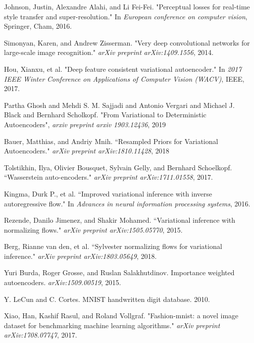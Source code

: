 \documentclass{article}
\begin{document}
\begin{thebibliography}{9}
    Johnson, Justin, Alexandre Alahi, and Li Fei-Fei. "Perceptual losses for real-time style transfer and super-resolution." In \textit{European conference on computer vision}, Springer, Cham, 2016.
    
    Simonyan, Karen, and Andrew Zisserman. "Very deep convolutional networks for large-scale image recognition." \textit{arXiv preprint arXiv:1409.1556}, 2014.
    
    Hou, Xianxu, et al. "Deep feature consistent variational autoencoder." In \textit{2017 IEEE Winter Conference on Applications of Computer Vision (WACV)}, IEEE, 2017.

  Partha Ghosh and Mehdi S. M. Sajjadi and Antonio Vergari and Michael J. Black and Bernhard Scholkopf. "From Variational to Deterministic Autoencoders", \textit{arxiv preprint arxiv 1903.12436}, 2019
  
    Bauer, Matthias, and Andriy Mnih. ``Resampled Priors for Variational Autoencoders." \textit{arXiv preprint arXiv:1810.11428}, 2018
    
    Tolstikhin, Ilya, Olivier Bousquet, Sylvain Gelly, and Bernhard Schoelkopf. ``Wasserstein auto-encoders." \textit{arXiv preprint arXiv:1711.01558}, 2017.

    Kingma, Durk P., et al. ``Improved variational inference with inverse autoregressive flow." In \textit{Advances in neural information processing systems}, 2016.
    
    Rezende, Danilo Jimenez, and Shakir Mohamed. ``Variational inference with normalizing flows." \textit{arXiv preprint arXiv:1505.05770}, 2015.

    Berg, Rianne van den, et al. ``Sylvester normalizing flows for variational inference." \textit{arXiv preprint arXiv:1803.05649}, 2018.
    
   Yuri Burda, Roger Grosse, and Ruslan Salakhutdinov. Importance weighted autoencoders. \textit{arXiv:1509.00519}, 2015.
   
    Y. LeCun and C. Cortes. MNIST handwritten digit database. 2010.
    
    Xiao, Han, Kashif Rasul, and Roland Vollgraf. "Fashion-mnist: a novel image dataset for benchmarking machine learning algorithms." \textit{arXiv preprint arXiv:1708.07747}, 2017.


\end{thebibliography}
\end{document}
